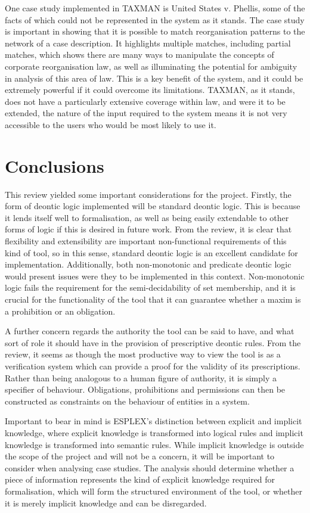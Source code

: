 \documentclass{l4proj}
\begin{document}
One case study implemented in TAXMAN is United States v. Phellis, some of the facts of which could not be represented in the system as it stands. The case study is important in showing that it is possible to match reorganisation patterns to the network of a case description. It highlights multiple matches, including partial matches, which shows there are many ways to manipulate the concepts of corporate reorganisation law, as well as illuminating the potential for ambiguity in analysis of this area of law. This is a key benefit of the system, and it could be extremely powerful if it could overcome its limitations. TAXMAN, as it stands, does not have a particularly extensive coverage within law, and were it to be extended, the nature of the input required to the system means it is not very accessible to the users who would be most likely to use it. 

\section{Conclusions}
This review yielded some important considerations for the project. Firstly, the form of deontic logic implemented will be standard deontic logic. This is because it lends itself well to formalisation, as well as being easily extendable to other forms of logic if this is desired in future work. From the review, it is clear that flexibility and extensibility are important non-functional requirements of this kind of tool, so in this sense, standard deontic logic is an excellent candidate for implementation. Additionally, both non-monotonic and predicate deontic logic would present issues were they to be implemented in this context. Non-monotonic logic fails the requirement for the semi-decidability of set membership, and it is crucial for the functionality of the tool that it can guarantee whether a maxim is a prohibition or an obligation. 

A further concern regards the authority the tool can be said to have, and what sort of role it should have in the provision of prescriptive deontic rules. From the review, it seems as though the most productive way to view the tool is as a verification system which can provide a proof for the validity of its prescriptions. Rather than being analogous to a human figure of authority, it is simply a specifier of behaviour. Obligations, prohibitions and permissions can then be constructed as constraints on the behaviour of entities in a system. 

Important to bear in mind is ESPLEX's distinction between explicit and implicit knowledge, where explicit knowledge is transformed into logical rules and implicit knowledge is transformed into semantic rules. While implicit knowledge is outside the scope of the project and will not be a concern, it will be important to consider when analysing case studies. The analysis should determine whether a piece of information represents the kind of explicit knowledge required for formalisation, which will form the structured environment of the tool, or whether it is merely implicit knowledge and can be disregarded. 
\end{document}
